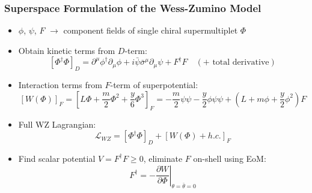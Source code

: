 \documentclass[10pt,aspectratio=169]{beamer}
\begin{document}
\begin{frame}
  \frametitle{Superspace Formulation of the Wess-Zumino Model}
  \begin{itemize}\itemsep1em
  \item $\phi$, $\psi$, $F$ $\to$ component fields of single chiral
    supermultiplet $\Phi$
  \item Obtain kinetic terms from $D$-term:
    \begin{equation*}
      \left [ \Phi^\dagger \Phi \right ]_D = \partial^\mu \phi^\dagger
      \partial_\mu \phi + i \bar{\psi} \bar{\sigma}^\mu \partial_\mu \psi
      + F^\dagger F \quad ( + \text{ total derivative})
    \end{equation*}
  \item Interaction terms from $F$-term of {\color{blue} superpotential}:
    \begin{equation*}
      \left [ W(\Phi) \right ]_F = \left [ L \Phi + \frac{m}{2} \Phi^2
        + \frac{y}{6} \Phi^3 \right ]_F
      = -\frac{m}{2} \psi \psi - \frac{y}{2} \phi \psi \psi
      + (L + m \phi + \frac{y}{2} \phi^2) F
    \end{equation*}
    \item Full WZ Lagrangian:
      \begin{equation*}
        \mathcal{L}_{WZ} = \left [ \Phi^\dagger \Phi \right ]_D
        + \left [ W(\Phi) + h.c. \right ]_F
      \end{equation*}
    \item Find scalar potential $V = F^\dagger F \geq 0$, eliminate
      $F$ on-shell using EoM:
      \begin{equation*}
        F^\dagger = - \left . \frac{\partial W}{\partial \Phi} \right |_{\theta
          = \bar{\theta} = 0}
      \end{equation*}
  \end{itemize}
\end{frame}
\end{document}
